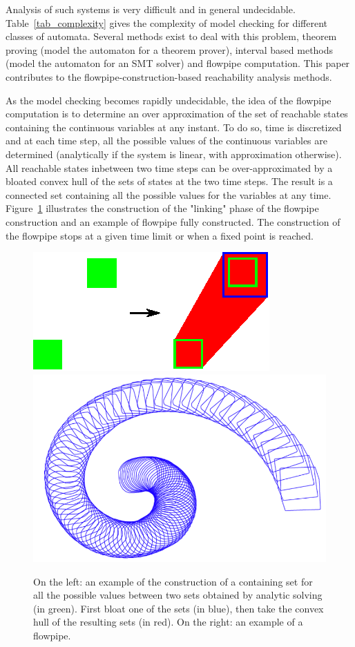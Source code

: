 Analysis of such systems is very difficult and in general undecidable. Table~\ref{tab_complexity} gives the complexity of model checking for different classes of automata. Several methods exist to deal with this problem, theorem proving (model the automaton for a theorem prover), interval based methods (model the automaton for an SMT solver) and flowpipe computation. This paper contributes to the flowpipe-construction-based reachability analysis methods. 

As the model checking becomes rapidly undecidable, the idea of the flowpipe computation is to determine an over approximation of the set of reachable states containing the continuous variables at any instant. To do so, time is discretized and at each time step, all the possible values of the continuous variables are determined (analytically if the system is linear, with approximation otherwise). All reachable states inbetween two time steps can be over-approximated by a bloated convex hull of the sets of states at the two time steps. The result is a connected set containing all the possible values for the variables at any time. Figure~\ref{fowpipeconstruction} illustrates the construction of the "linking" phase of the flowpipe construction and an example of flowpipe fully constructed. The construction of the flowpipe stops at a given time limit or when a fixed point is reached.

\begin{figure}
\includegraphics[width=0.45\columnwidth]{images/flowpipe.eps}
\includegraphics[width=0.45\columnwidth]{images/zono.png}
\caption{On the left: an example of the construction of a containing set for all the possible values between two sets obtained by analytic solving (in green). First bloat one of the sets (in blue), then take the convex hull of the resulting sets (in red). On the right: an example of a flowpipe.}
\label{fowpipeconstruction}
\end{figure}

